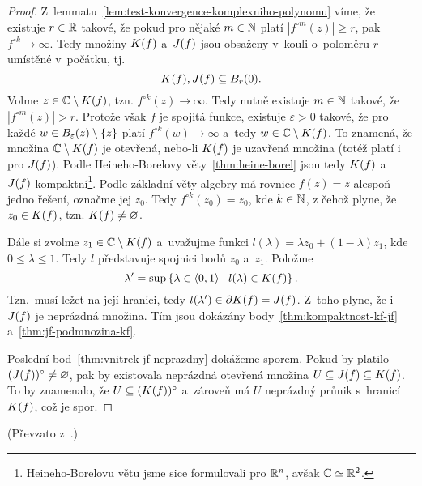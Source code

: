 \begin{proof}
    Z~lemmatu~\ref{lem:test-konvergence-komplexniho-polynomu} víme, že existuje $r\in\mathbb{R}$ takové, že pokud pro nějaké $m\in\mathbb{N}$ platí $|f^{\circ m}(z)|\geqslant r$, pak $f^{\circ k}\to\infty$. Tedy množiny $K(f)$ a~$J(f)$ jsou obsaženy v~kouli o~poloměru $r$ umístěné v~počátku, tj.
    \[K(f),J(f)\subseteq B_r(0).\]
    Volme $z\in\mathbb{C}\setminus K(f)$, tzn. $f^{\circ k}(z)\to\infty$. Tedy nutně existuje $m\in\mathbb{N}$ takové, že $|f^{\circ m}(z)|>r$. Protože však $f$ je spojitá funkce, existuje $\varepsilon>0$ takové, že pro každé $w\in B_\varepsilon(z)\setminus\left\{z\right\}$ platí $f^{\circ k}(w)\to\infty$ a~tedy $w\in\mathbb{C}\setminus K(f)$. To znamená, že množina $\mathbb{C}\setminus K(f)$ je otevřená, nebo-li $K(f)$ je uzavřená množina (totéž platí i pro $J(f)$). Podle Heineho-Borelovy věty~\ref{thm:heine-borel} jsou tedy $K(f)$ a~$J(f)$ kompaktní\footnote{Heineho-Borelovu větu jsme sice formulovali pro $\mathbb{R}^n$, avšak $\mathbb{C}\simeq\mathbb{R}^2$.}. Podle základní věty algebry má rovnice $f(z)=z$ alespoň jedno řešení, označme jej $z_0$. Tedy $f^{\circ k}(z_0)=z_0$, kde $k\in\mathbb{N}$, z čehož plyne, že $z_0\in K(f)$, tzn. $K(f)\neq\varnothing$.
    
    Dále si zvolme $z_1\in\mathbb{C}\setminus K(f)$ a~uvažujme funkci $l(\lambda)=\lambda z_0+(1-\lambda)z_1$, kde $0\leqslant\lambda\leqslant 1$. Tedy $l$ představuje spojnici bodů $z_0$ a~$z_1$. Položme
    \[\lambda^\prime=\sup\left\{\lambda\in\langle0,1\rangle\mid l(\lambda)\in K(f)\right\}.\]
    Tzn.~musí ležet na její hranici, tedy $l(\lambda^\prime)\in\partial K(f)=J(f)$. Z~toho plyne, že i~$J(f)$ je neprázdná množina. Tím jsou dokázány body~\ref{thm:kompaktnost-kf-jf} a~\ref{thm:jf-podmnozina-kf}.

    Poslední bod~\ref{thm:vnitrek-jf-neprazdny} dokážeme sporem. Pokud by platilo  $(J(f))^\circ\neq\varnothing$, pak by existovala neprázdná otevřená množina $U\subseteq J(f)\subseteq K(f)$. To by znamenalo, že $U\subseteq(K(f))^\circ$ a~zároveň má $U$ neprázdný průnik s~hranicí $K(f)$, což je spor.
\end{proof}
(Převzato z~\citep[str. 237]{Falconer1989}.)

